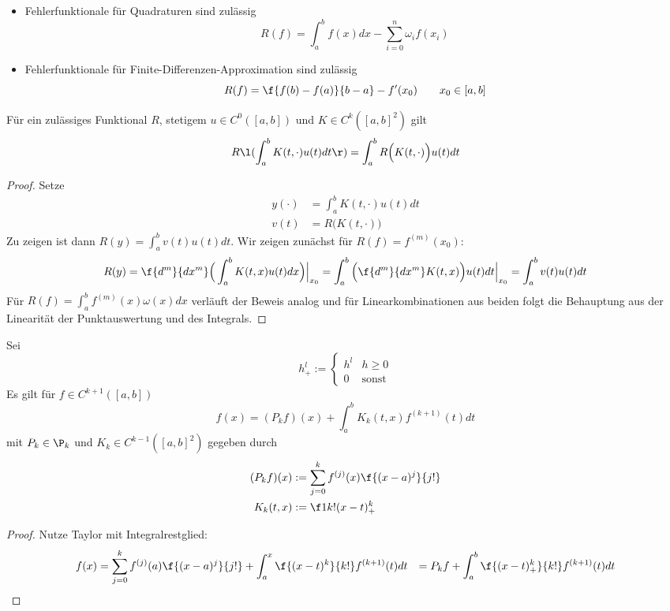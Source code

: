 \documentclass[11pt]{scrbook}
\begin{document}
\begin{ex*}
	\begin{itemize}
		\item
			Fehlerfunktionale für Quadraturen sind zulässig
			\[
				R(f) = \int_a^b f(x) dx - \sum_{i=0}^n \omega_i f(x_i)
			\]
		\item
			Fehlerfunktionale für Finite-Differenzen-Approximation sind zulässig
			\[
				R(f) = \f {f(b)-f(a)}{b-a} - f'(x_0) \qquad x_0\in [a,b]
			\]
	\end{itemize}
\end{ex*}

\begin{lem}[Vertauschungsregel]
	\label{2.28}	
	Für ein zulässiges Funktional $R$, stetigem $u\in C^0([a,b])$ und $K\in C^k([a,b]^2)$ gilt
	\[
		R\l( \int_a^b K(t,\cdot) u(t) dt \r) 
		= \int_a^b R\Big(K(t,\cdot)\Big) u(t) dt
	\]
	\begin{proof}
		Setze
		\begin{align*}
			y(\cdot) &= \int_a^b K(t,\cdot) u(t) dt \\
			v(t) &= R\big(K(t,\cdot)\big)
		\end{align*}
		Zu zeigen ist dann $R(y) = \int_a^b v(t) u(t) dt$.
		Wir zeigen zunächst für $R(f) = f^{(m)}(x_0)$:
		\begin{align*}
			R(y) = \f {d^m}{dx^m} \Big( \int_a^b K(t,x) u(t) dx \Big) \Big|_{x_0}
			= \int_a^b \Big( \f {d^m}{dx^m} K(t,x) \Big) u(t) dt \Big|_{x_0}
			= \int_a^b v(t) u(t) dt
		\end{align*}
		Für $R(f) = \int_a^b f^{(m)}(x) \omega(x) dx$ verläuft der Beweis analog und für Linearkombinationen aus beiden folgt die Behauptung aus der Linearität der Punktauswertung und des Integrals.
	\end{proof}
\end{lem}

\begin{lem}
	\label{2.29}
	Sei 
	\[
		h_+^l := \begin{cases}h^l & h\ge 0 \\ 0 & \text{sonst}\end{cases}
	\]
	Es gilt für $f\in C^{k+1}([a,b])$
	\[
		f(x) = (P_kf)(x) + \int_a^b K_k(t,x) f^{(k+1)}(t) dt
	\]
	mit $P_k \in \P_k$ und $K_k \in C^{k-1}([a,b]^2)$ gegeben durch
	\begin{align*}
		(P_kf)(x) &:= \sum_{j=0}^k f^{(j)}(x) \f {(x-a)^j}{j!} \\
		K_k(t,x) &:= \f 1{k!}(x-t)^k_+
	\end{align*}
	\begin{proof}
		Nutze Taylor mit Integralrestglied:
		\begin{align*}
			f(x) &= \sum_{j=0}^k f^{(j)}(a) \f {(x-a)^j}{j!} + \int_a^x \f {(x-t)^k}{k!} f^{(k+1)}(t) dt
			&= P_k f + \int_a^b \f {(x-t)^k_+}{k!} f^{(k+1)} (t) dt
		\end{align*}
	\end{proof}
\end{lem}
\end{document}
